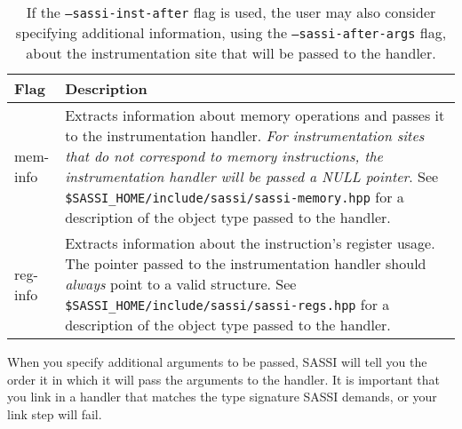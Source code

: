\begin{table}
\center
\begin{tabular}{|l|L{3.4in}|}
\hline Flag & Description \\ \hline 
mem-info &
Extracts information about memory operations and passes it to the
instrumentation handler.  \emph{For instrumentation sites that do not
  correspond to memory instructions, the instrumentation handler will
  be passed a NULL pointer}.  See
\texttt{\$SASSI\_HOME/include/sassi/sassi-memory.hpp} for a description
of the object type passed to the handler. \\ \hline reg-info &
Extracts information about the instruction's register usage.  The
pointer passed to the instrumentation handler should \emph{always}
point to a valid structure.  See
\texttt{\$SASSI\_HOME/include/sassi/sassi-regs.hpp} for a description of
the object type passed to the handler. \\ \hline
\end{tabular}
\caption{If the \texttt{--sassi-inst-after} flag is used, the
  user may also consider specifying additional information, using the
  \texttt{--sassi-after-args} flag, about the instrumentation site
  that will be passed to the handler.}
\label{tab:after-args}
\end{table}

When you specify additional arguments to be passed, SASSI will tell
you the order it in which it will pass the arguments to the handler.
It is important that you link in a handler that matches the type
signature SASSI demands, or your link step will fail.
